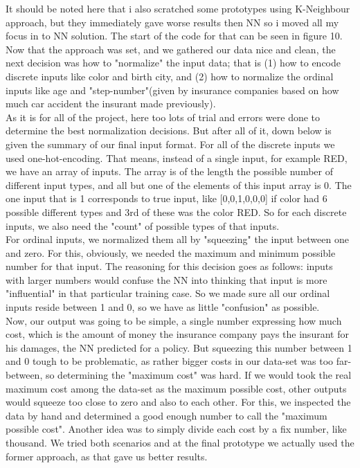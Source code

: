 \documentclass[titlepage, a4paper, 14pt]{extarticle} %
\begin{document}
It should be noted here that i also scratched some prototypes using K-Neighbour approach, but they immediately gave worse results then NN so i moved all my focus in to NN solution. The start of the code for that can be seen in figure 10. \\

Now that the approach was set, and we gathered our data nice and clean, the next decision was how to "normalize" the input data; that is (1) how to encode discrete inputs like color and birth city, and (2) how to normalize the ordinal inputs like age and "step-number"(given by insurance companies based on how much car accident the insurant made previously). \\

As it is for all of the project, here too lots of trial and errors were done to determine the best normalization decisions. But after all of it, down below is given the summary of our final input format. For all of the discrete inputs we used one-hot-encoding. That means, instead of a single input, for example RED, we have an array of inputs. The array is of the length the possible number of different input types, and all but one of the elements of this input array is 0. The one input that is 1 corresponds to true input, like [0,0,1,0,0,0] if color had 6 possible different types and 3rd of these was the color RED. So for each discrete inputs, we also need the "count" of possible types of that inputs.\\

For ordinal inputs, we normalized them all by "squeezing" the input between one and zero. For this, obviously, we needed the maximum and minimum possible number for that input. The reasoning for this decision goes as follows: inputs with larger numbers would confuse the NN into thinking that input is more "influential" in that particular training case. So we made sure all our ordinal inputs reside between 1 and 0, so we have as little "confusion" as possible. \\

Now, our output was going to be simple, a single number expressing how much cost, which is the amount of money the insurance company pays the insurant for his damages, the NN predicted for a policy. But squeezing this number between 1 and 0 tough to be problematic, as rather bigger costs in our data-set was too far-between, so determining the "maximum cost" was hard. If we would took the real maximum cost among the data-set as the maximum possible cost, other outputs would squeeze too close to zero and also to each other. For this, we inspected the data by hand and determined a good enough number to call the "maximum possible cost". Another idea was to simply divide each cost by a fix number, like thousand. We tried both scenarios and at the final prototype we actually used the former approach, as that gave us better results. \\
\end{document}

